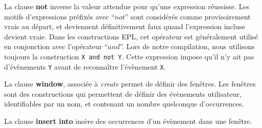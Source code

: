 La clause {\bf not} inverse la valeur attendue pour qu'une expression réussisse. Les motifs d'expressions préfixés avec ``$not$'' sont considérés comme provisoirement vrais au départ, et deviennent définitivement faux quand l'expression incluse devient vraie. Dans les constructions EPL, cet opérateur est généralement utilisé en conjonction avec l'opérateur ``$and$''. Lors de notre compilation, nous utilisons toujours la construction {\tt X~and~not~Y}.
Cette expression impose qu'il n'y ait pas d'évènements {\tt Y} avant de reconnaître l'évènement {\tt X}.
\newline

La clause {\bf window}, associée à {\em create} permet de définir des fenêtres.  Les fenêtres sont des constructions qui permettent de définir des évènements utilisateur, identifiables par un nom, et contenant un nombre quelconque d'occurrences.
\newline

La clause {\bf insert into} insère des occurrences d'un évènement dans une fenêtre.

